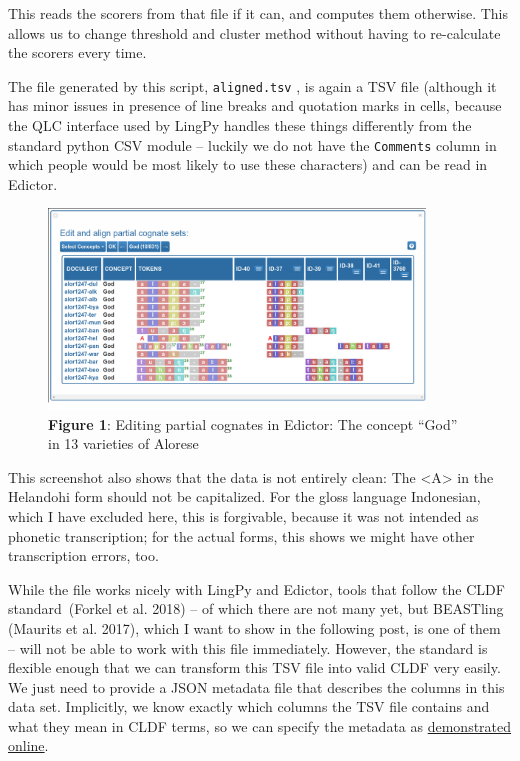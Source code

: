 \documentclass[
  a4paper,
  14pt,
  oneside,
  tablecaptionabove
]{scrbook}
\begin{document}
This reads the scorers from that file if it can, and computes them
otherwise. This allows us to change threshold and cluster method without
having to re-calculate the scorers every time.

The file generated by this script, \lstinline!aligned.tsv! , is again a
TSV file (although it has minor issues in presence of line breaks and
quotation marks in cells, because the QLC interface used by LingPy
handles these things differently from the standard python CSV module --
luckily we do not have the \lstinline!Comments! column in which people
would be most likely to use these characters) and can be read in
Edictor.

\begin{figure}[htb]
\centering
\includegraphics[width=10cm]{images/pcogs.png}
\captionsetup{justification=centering}
\caption*{\small \textbf{Figure 1}: Editing partial cognates in Edictor: The concept \enquote{God} in 13
varieties of Alorese}
\end{figure}

This screenshot also shows that the data is not entirely clean: The
\textless{}A\textgreater{} in the Helandohi form should not be
capitalized. For the gloss language Indonesian, which I have excluded
here, this is forgivable, because it was not intended as phonetic
transcription; for the actual forms, this shows we might have other
transcription errors, too.

While the file works nicely with LingPy and
Edictor, tools that follow the CLDF standard~(Forkel et al. 2018) -- of
which there are not many yet, but BEASTling (Maurits et al. 2017), which
I want to show in the following post, is one of them -- will not be able
to work with this file immediately. However, the standard is flexible
enough that we can transform this TSV file into valid CLDF very easily.
We just need to provide a JSON metadata file that describes the columns
in this data set. Implicitly, we know exactly which columns the TSV file
contains and what they mean in CLDF terms, so we can specify the
metadata as \href{https://calc.hypotheses.org/849}{demonstrated online}.
\end{document}
